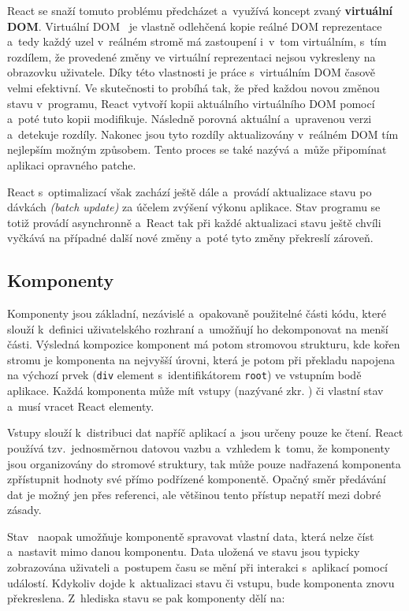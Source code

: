 React se snaží tomuto problému předcházet a~využívá koncept zvaný \textbf{virtuální DOM}. Virtuální DOM~\cite{website:ReactVirtualDOM} je vlastně odlehčená kopie reálné DOM reprezentace a~tedy každý uzel v~reálném stromě má zastoupení i~v~tom virtuálním, s~tím rozdílem, že provedené změny ve virtuální reprezentaci nejsou vykresleny na obrazovku uživatele. Díky této vlastnosti je práce s~virtuálním DOM časově velmi efektivní. Ve skutečnosti to probíhá tak, že před každou novou změnou stavu v~programu, React vytvoří kopii aktuálního virtuálního DOM pomocí \emph{} a~poté tuto kopii modifikuje. Následně porovná aktuální a~upravenou verzi a~detekuje rozdíly. Nakonec jsou tyto rozdíly aktualizovány v~reálném DOM tím nejlepším možným způsobem. Tento proces se také nazývá \emph{} a~může připomínat aplikaci opravného patche.

React s~optimalizací však zachází ještě dále a~provádí aktualizace stavu po dávkách \emph{(batch update)} za účelem zvýšení výkonu aplikace. Stav programu se totiž provádí asynchronně a~React tak při každé aktualizaci stavu ještě chvíli vyčkává na případné další nové změny a~poté tyto změny překreslí zároveň.

\subsection{Komponenty}
Komponenty jsou základní, nezávislé a~opakovaně použitelné části kódu, které slouží k~definici uživatelského rozhraní a~umožňují ho dekomponovat na menší části. Výsledná kompozice komponent má potom stromovou strukturu, kde kořen stromu je komponenta na nejvyšší úrovni, která je potom při překladu napojena na výchozí prvek (\texttt{div} element s~identifikátorem \texttt{root}) ve vstupním bodě aplikace. Každá komponenta může mít vstupy (nazývané \emph{} zkr. \emph{}) či vlastní stav a~musí vracet React elementy. 

Vstupy slouží k~distribuci dat napříč aplikací a~jsou určeny pouze ke čtení. React používá tzv.~jednosměrnou datovou vazbu a~vzhledem k~tomu, že komponenty jsou organizovány do stromové struktury, tak může pouze nadřazená komponenta zpřístupnit hodnoty své přímo podřízené komponentě. Opačný směr předávání dat je možný jen přes referenci, ale většinou tento přístup nepatří mezi dobré zásady. 

Stav~\cite{thesis:WebApp} naopak umožňuje komponentě spravovat vlastní data, která nelze číst a~nastavit mimo danou komponentu. Data uložená ve stavu jsou typicky zobrazována uživateli a~postupem času se mění při interakci s~aplikací pomocí událostí. Kdykoliv dojde k~aktualizaci stavu či vstupu, bude komponenta znovu překreslena. Z~hlediska stavu se pak komponenty dělí na:

